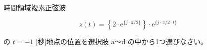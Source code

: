 時間領域複素正弦波

\[
z(t) =  \left \{ 2 \cdot \textrm{e}^{\{j \cdot \pi/2 \}} \right \} \cdot \textrm{e}^{\{ j \cdot \pi/2 \cdot t \}}
\]

\bigskip
\noindent の $t = -1$ [秒]地点の位置を選択肢 a〜d の中から1つ選びなさい。
